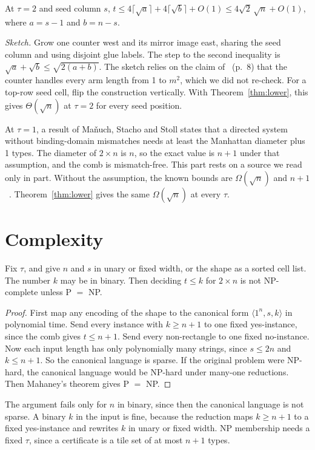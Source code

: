 \documentclass[10pt]{hackr26}
\begin{document}
\begin{prop}[sketch]\label{prop:interior}
At $\tau=2$ and seed column $s$, $t\le4\lceil\sqrt a\rceil+4\lceil\sqrt b\rceil+O(1)\le4\sqrt2\,\sqrt n+O(1)$, where $a=s-1$ and $b=n-s$.
\end{prop}
\noindent\emph{Sketch.}
Grow one counter west and its mirror image east, sharing the seed column and using disjoint glue labels.
The step to the second inequality is $\sqrt a+\sqrt b\le\sqrt{2(a+b)}$.
The sketch relies on the claim of~\cite{ACG05} (p.~8) that the counter handles every arm length from 1 to $m^2$, which we did not re-check.
For a top-row seed cell, flip the construction vertically.
With Theorem~\ref{thm:lower}, this gives $\Theta(\sqrt n)$ at $\tau=2$ for every seed position.

At $\tau=1$, a result of Ma\v{n}uch, Stacho and Stoll states that a directed system without binding-domain mismatches needs at least the Manhattan diameter plus 1 types.
The diameter of $2\times n$ is $n$, so the exact value is $n+1$ under that assumption, and the comb is mismatch-free.
This part rests on a source we read only in part.
Without the assumption, the known bounds are $\Omega(\sqrt n)$ and $n+1$~\cite{FSW19}.
Theorem~\ref{thm:lower} gives the same $\Omega(\sqrt n)$ at every $\tau$.

\section{Complexity} \label{sec:cx}

\begin{theorem}\label{thm:sparse}
Fix $\tau$, and give $n$ and $s$ in unary or fixed width, or the shape as a sorted cell list.
The number $k$ may be in binary.
Then deciding $t\le k$ for $2\times n$ is not NP-complete unless P $=$ NP.
\end{theorem}
\begin{proof}
First map any encoding of the shape to the canonical form $\langle1^n,s,k\rangle$ in polynomial time.
Send every instance with $k\ge n+1$ to one fixed yes-instance, since the comb gives $t\le n+1$.
Send every non-rectangle to one fixed no-instance.
Now each input length has only polynomially many strings, since $s\le2n$ and $k\le n+1$.
So the canonical language is sparse.
If the original problem were NP-hard, the canonical language would be NP-hard under many-one reductions.
Then Mahaney's theorem gives P $=$ NP.
\end{proof}
The argument fails only for $n$ in binary, since then the canonical language is not sparse.
A binary $k$ in the input is fine, because the reduction maps $k\ge n+1$ to a fixed yes-instance and rewrites $k$ in unary or fixed width.
NP membership needs a fixed $\tau$, since a certificate is a tile set of at most $n+1$ types.
\end{document}
